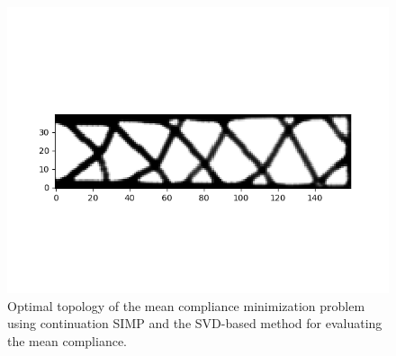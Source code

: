       \begin{figure}
        \centering
        \includegraphics[width=\textwidth]{./images/robust_exact/exact_svd_mean_csimp.png}
        \caption{Optimal topology of the mean compliance minimization problem using continuation SIMP and the SVD-based method for evaluating the mean compliance.}
        \label{fig:mean}
      \end{figure}


